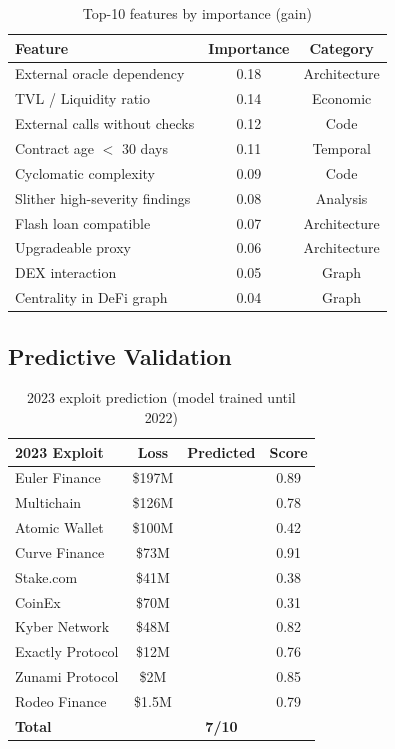 \documentclass[11pt]{article}
\newcommand{\cmark}{\ding{51}}
\newcommand{\xmark}{\ding{55}}
\theoremstyle{definition}
\theoremstyle{plain}
\theoremstyle{remark}
\begin{document}
\begin{table}[H]
\centering
\caption{Top-10 features by importance (gain)}
\label{tab:feature_importance}
\begin{tabular}{lcc}
\toprule
\textbf{Feature} & \textbf{Importance} & \textbf{Category} \\
\midrule
External oracle dependency & 0.18 & Architecture \\
TVL / Liquidity ratio & 0.14 & Economic \\
External calls without checks & 0.12 & Code \\
Contract age $<$ 30 days & 0.11 & Temporal \\
Cyclomatic complexity & 0.09 & Code \\
Slither high-severity findings & 0.08 & Analysis \\
Flash loan compatible & 0.07 & Architecture \\
Upgradeable proxy & 0.06 & Architecture \\
DEX interaction & 0.05 & Graph \\
Centrality in DeFi graph & 0.04 & Graph \\
\bottomrule
\end{tabular}
\end{table}

\subsection{Predictive Validation}

\begin{table}[H]
\centering
\caption{2023 exploit prediction (model trained until 2022)}
\label{tab:prediction_2023}
\begin{tabular}{lccc}
\toprule
\textbf{2023 Exploit} & \textbf{Loss} & \textbf{Predicted} & \textbf{Score} \\
\midrule
Euler Finance & \$197M & \cmark & 0.89 \\
Multichain & \$126M & \cmark & 0.78 \\
Atomic Wallet & \$100M & \xmark & 0.42 \\
Curve Finance & \$73M & \cmark & 0.91 \\
Stake.com & \$41M & \xmark & 0.38 \\
CoinEx & \$70M & \xmark & 0.31 \\
Kyber Network & \$48M & \cmark & 0.82 \\
Exactly Protocol & \$12M & \cmark & 0.76 \\
Zunami Protocol & \$2M & \cmark & 0.85 \\
Rodeo Finance & \$1.5M & \cmark & 0.79 \\
\midrule
\textbf{Total} & & \textbf{7/10} & \\
\bottomrule
\end{tabular}
\end{table}
\end{document}
